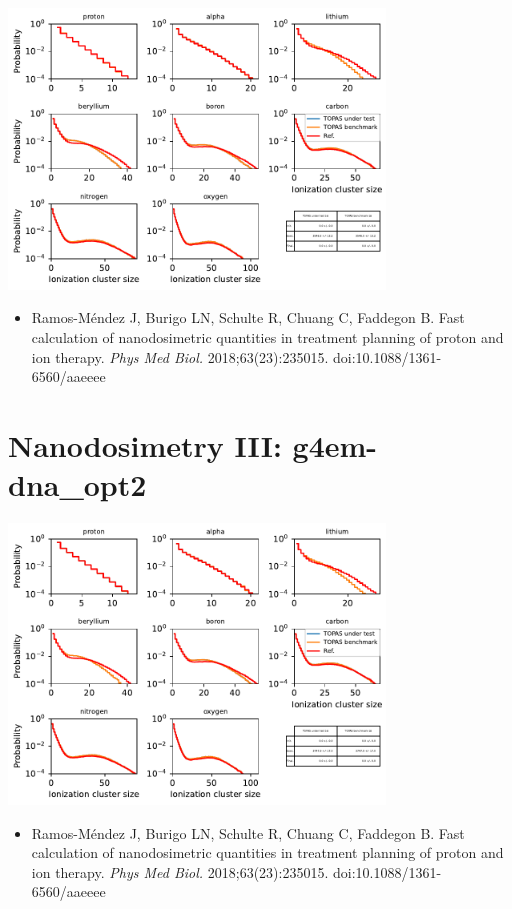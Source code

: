 \documentclass[aspectratio=1610]{beamer}
\begin{document}
\begin{frame}{\secname}
 \centering
   \includegraphics[width=0.75\textwidth]{./NanodosimetryIII/nanoIII_TsEMDNAPhysics}
\begin{itemize}
 \item \tiny{Ramos-M\'endez J, Burigo LN, Schulte R, Chuang C, Faddegon B. Fast calculation of nanodosimetric quantities in treatment planning of proton and ion therapy. \textit{Phys Med Biol.} 2018;63(23):235015. doi:10.1088/1361-6560/aaeeee}
\end{itemize}
\end{frame}

\section{Nanodosimetry III: g4em-dna\_opt2}

\begin{frame}{\secname}
 \centering
   \includegraphics[width=0.75\textwidth]{./NanodosimetryIII/nanoIII_opt2}
\begin{itemize}
 \item \tiny{Ramos-M\'endez J, Burigo LN, Schulte R, Chuang C, Faddegon B. Fast calculation of nanodosimetric quantities in treatment planning of proton and ion therapy. \textit{Phys Med Biol.} 2018;63(23):235015. doi:10.1088/1361-6560/aaeeee}
\end{itemize}
\end{frame}
\end{document}
